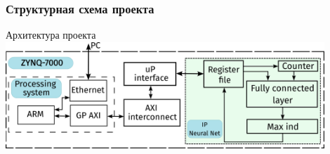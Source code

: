 \begin{frame}[t]
    \frametitle{Структурная схема проекта}
    \begin{block}{\centering Архитектура проекта}
        \vspace{1mm}
        \centering \includegraphics[width = 0.9\textwidth]{pics/struct.png}
    \end{block}   
\end{frame}


